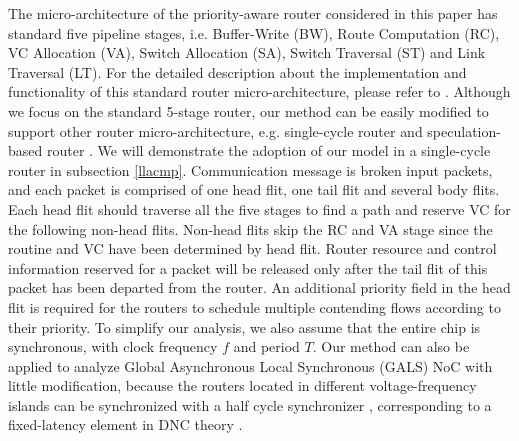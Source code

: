 \documentclass[10pt,journal]{IEEEtran}
\begin{document}
The micro-architecture of the priority-aware router considered in this paper has standard five pipeline stages, i.e. Buffer-Write (BW), Route Computation (RC), VC Allocation (VA), Switch Allocation (SA), Switch Traversal (ST) and Link Traversal (LT). For the detailed description about the implementation and functionality of this standard router micro-architecture, please refer to \cite{jerger2009chip}. Although we focus on the standard 5-stage router, our method can be easily modified to support other router micro-architecture, e.g. single-cycle router \cite{627905}\cite{Shi:2008:RCA:1397757.1397996}\cite{707545}\cite{73} and speculation-based router \cite{jerger2009chip}. We will demonstrate the adoption of our model in a single-cycle router in subsection \ref{llacmp}. Communication message is broken input packets, and each packet is comprised of one head flit, one tail flit and several body flits. Each head flit should traverse all the five stages to find a path and reserve VC for the following non-head flits. Non-head flits skip the RC and VA stage since the routine and VC have been determined by head flit. Router resource and control information reserved for a packet will be released only after the tail flit of this packet has been departed from the router. An additional priority field in the head flit is required for the routers to schedule multiple contending flows according to their priority. To simplify our analysis, we also assume that the entire chip is synchronous, with clock frequency $f$ and period $T$. Our method can also be applied to analyze Global Asynchronous Local Synchronous (GALS) NoC with little modification, because the routers located in different voltage-frequency islands can be synchronized with a half cycle synchronizer \cite{5476986}, corresponding to a fixed-latency element in DNC theory \cite{Boudec2001Network}.
\end{document}
